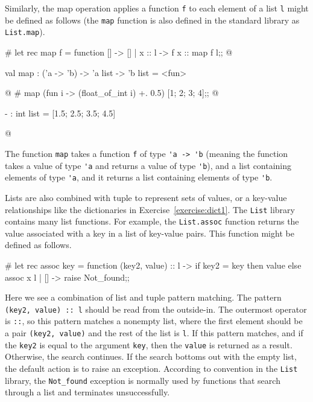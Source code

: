 Similarly, the map operation applies a function \lstinline/f/ to each
element of a list \lstinline/l/ might be defined as follows (the
\lstinline/map/ function is also defined in the standard library as
\hbox{\hbox{\lstinline/List.map/}}).

\begin{ocaml}
# let rec map f = function
   [] -> []
 | x :: l -> f x :: map f l;;
@
\begin{topoutput}
val map : ('a -> 'b) -> 'a list -> 'b list = <fun>
\end{topoutput}
@
# map (fun i -> (float_of_int i) +. 0.5) [1; 2; 3; 4];;
@
\begin{topoutput}
- : int list = [1.5; 2.5; 3.5; 4.5]
\end{topoutput}
@
\end{ocaml}
%
The function \hbox{\hbox{\lstinline/map/}} takes a
function \hbox{\hbox{\lstinline/f/}} of type \hbox{\lstinline/'a -> 'b/}
(meaning the function takes a value of type \hbox{\hbox{\lstinline/'a/}}
and returns a value of type \hbox{\hbox{\lstinline/'b/}}), and a list
containing elements of type
\hbox{\hbox{\lstinline/'a/}}, and it returns a list containing elements of
type \hbox{\hbox{\lstinline/'b/}}.

Lists are also combined with tuple to represent sets of values, or a
key-value relationships like the dictionaries in
Exercise~\ref{exercise:dict1}.  The \hbox{\hbox{\lstinline/List/}} library
contains many list functions.  For example,
the \hbox{\hbox{\lstinline/List.assoc/}} function returns the value
associated with a key in a list of key-value pairs.  This function
might be defined as follows.

\begin{ocaml}
# let rec assoc key = function
     (key2, value) :: l ->
        if key2 = key then
           value
        else
           assoc x l
   | [] ->
        raise Not_found;;
\end{ocaml}
%
Here we see a combination of list and tuple pattern matching.  The
pattern \hbox{\hbox{\lstinline/(key2, value) :: l/}} should be read from the outside-in.
The outermost operator is \hbox{\hbox{\lstinline/::/}}, so this pattern matches a
nonempty list, where the first element should be a pair 
\lstinline$(key2, value)$
and the rest of the list is \hbox{\hbox{\lstinline/l/}}.  If this pattern
matches, and if the \hbox{\hbox{\lstinline/key2/}} is equal to the argument \hbox{\lstinline/key/},
then the \hbox{\hbox{\lstinline/value/}} is returned as a result.  Otherwise, the search
continues.  If the search bottoms out with the empty list, the default
action is to raise an exception.  According to convention in the
\hbox{\hbox{\lstinline/List/}} library, the \hbox{\lstinline/Not_found/} exception is normally used
by functions that search through a list and terminates unsuccessfully.

